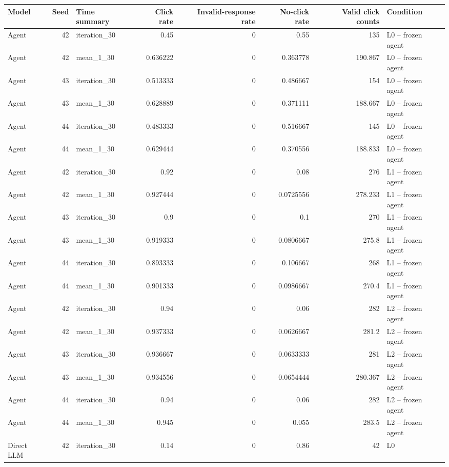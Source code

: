 \begin{table}[htbp!]
\centering
\small
\setlength{\tabcolsep}{3pt}
\renewcommand{\arraystretch}{1.1}
\begin{tabular}{lrlrrrrl}
\hline
Model & Seed & Time summary & Click rate & Invalid-response rate & No-click rate & Valid click counts & Condition \\
\hline
Agent & 42 & iteration\_30 & 0.45 & 0 & 0.55 & 135 & L0 -- frozen agent \\
Agent & 42 & mean\_1\_30 & 0.636222 & 0 & 0.363778 & 190.867 & L0 -- frozen agent \\
Agent & 43 & iteration\_30 & 0.513333 & 0 & 0.486667 & 154 & L0 -- frozen agent \\
Agent & 43 & mean\_1\_30 & 0.628889 & 0 & 0.371111 & 188.667 & L0 -- frozen agent \\
Agent & 44 & iteration\_30 & 0.483333 & 0 & 0.516667 & 145 & L0 -- frozen agent \\
Agent & 44 & mean\_1\_30 & 0.629444 & 0 & 0.370556 & 188.833 & L0 -- frozen agent \\
Agent & 42 & iteration\_30 & 0.92 & 0 & 0.08 & 276 & L1 -- frozen agent \\
Agent & 42 & mean\_1\_30 & 0.927444 & 0 & 0.0725556 & 278.233 & L1 -- frozen agent \\
Agent & 43 & iteration\_30 & 0.9 & 0 & 0.1 & 270 & L1 -- frozen agent \\
Agent & 43 & mean\_1\_30 & 0.919333 & 0 & 0.0806667 & 275.8 & L1 -- frozen agent \\
Agent & 44 & iteration\_30 & 0.893333 & 0 & 0.106667 & 268 & L1 -- frozen agent \\
Agent & 44 & mean\_1\_30 & 0.901333 & 0 & 0.0986667 & 270.4 & L1 -- frozen agent \\
Agent & 42 & iteration\_30 & 0.94 & 0 & 0.06 & 282 & L2 -- frozen agent \\
Agent & 42 & mean\_1\_30 & 0.937333 & 0 & 0.0626667 & 281.2 & L2 -- frozen agent \\
Agent & 43 & iteration\_30 & 0.936667 & 0 & 0.0633333 & 281 & L2 -- frozen agent \\
Agent & 43 & mean\_1\_30 & 0.934556 & 0 & 0.0654444 & 280.367 & L2 -- frozen agent \\
Agent & 44 & iteration\_30 & 0.94 & 0 & 0.06 & 282 & L2 -- frozen agent \\
Agent & 44 & mean\_1\_30 & 0.945 & 0 & 0.055 & 283.5 & L2 -- frozen agent \\
Direct LLM & 42 & iteration\_30 & 0.14 & 0 & 0.86 & 42 & L0 \\

\end{tabular}
\end{table}
